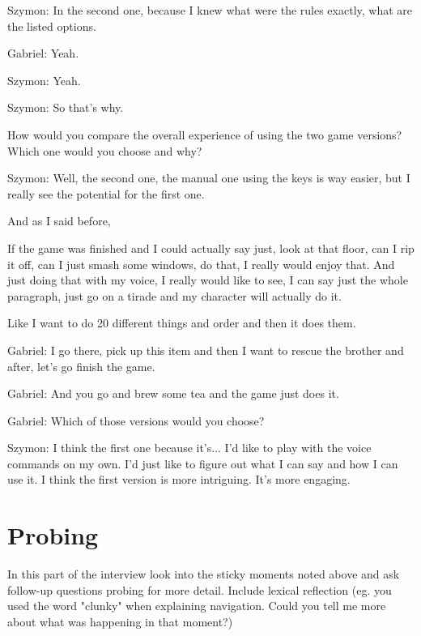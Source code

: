 \begin{QandA}
\begin{answered}
            Szymon: In the second one, because I knew what were the rules exactly, what are the listed options.

            Gabriel: Yeah.

            Szymon: Yeah.

            Szymon: So that's why.
         \end{answered}
    \item How would you compare the overall experience of using the two game versions? Which one would you choose and why?

         \begin{answered}
            Szymon: Well, the second one, the manual one using the keys is way easier, but I really see the potential for the first one.

             And as I said before,

            If the game was finished and I could actually say just, look at that floor, can I rip it off, can I just smash some windows, do that, I really would enjoy that.
            And just doing that with my voice, I really would like to see, I can say just the whole paragraph, just go on a tirade and my character will actually do it.

             Like I want to do 20 different things and order and then it does them.

            Gabriel: I go there, pick up this item and then I want to rescue the brother and after, let's go finish the game.

            Gabriel: And you go and brew some tea and the game just does it.

            Gabriel: Which of those versions would you choose?

            Szymon: I think the first one because it's...
            I'd like to play with the voice commands on my own.
            I'd just like to figure out what I can say and how I can use it.
            I think the first version is more intriguing.
            It's more engaging.

            
         \end{answered}
\end{QandA}






\section{Probing}
In this part of the interview look into the sticky moments noted above and ask follow-up questions probing for more detail.
Include lexical reflection (eg. you used the word "clunky" when explaining navigation. Could you tell me more about what was happening
in that moment?)

